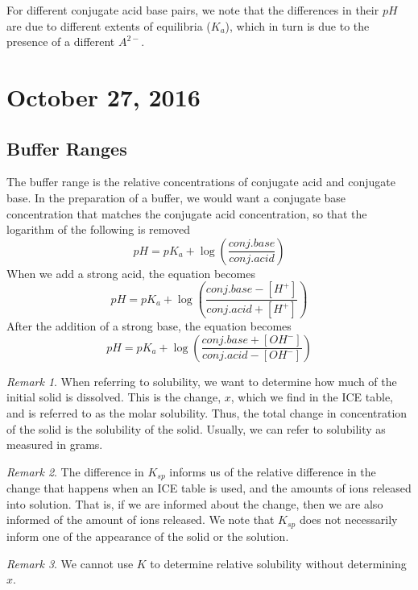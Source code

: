 \documentclass[11pt]{article}
\theoremstyle{plain} %
\theoremstyle{definition}
\theoremstyle{example}
\theoremstyle{remark}
\newtheorem*{remark}{Remark}
\begin{document}
For different conjugate acid base pairs, we note that the differences in their $pH$ are due to different extents of equilibria ($K_a$), which in turn is due to the presence of a different $A^{2-}$. 



\section{October 27, 2016}
\subsection{Buffer Ranges}




The buffer range is the relative concentrations of conjugate acid and conjugate base. In the preparation of a buffer, we would want a conjugate base concentration that matches the conjugate acid concentration, so that the logarithm of the following is removed $$pH = pK_a + \log\left(\frac{conj. base}{conj. acid}\right)$$When we add a strong acid, the equation becomes $$pH = pK_a + \log\left(\frac{conj.base -\left[H^+\right]}{conj.acid + \left[H^+\right]}\right)$$ After the addition of a strong base, the equation becomes $$pH = pK_a + \log\left(\frac{conj.base  +\left[OH^-\right]}{conj.acid - \left[OH^-\right]}\right)$$

\begin{remark}
When referring to solubility, we want to determine how much of the initial solid is dissolved. This is the change, $x$, which we find in the ICE table, and is referred to as the molar solubility. Thus, the total change in concentration of the solid is the solubility of the solid. Usually, we can refer to solubility as measured in grams. 
\end{remark}

\begin{remark}
The difference in $K_{sp}$ informs us of the relative difference in the change that happens when an ICE table is used, and the amounts of ions released into solution. That is, if we are informed about the change, then we are also informed of the amount of ions released. We note that $K_{sp}$ does not necessarily inform one of the appearance of the solid or the solution. 
\end{remark}

\begin{remark}
We cannot use $K$ to determine relative solubility without determining $x$. 
\end{remark}
\end{document}
